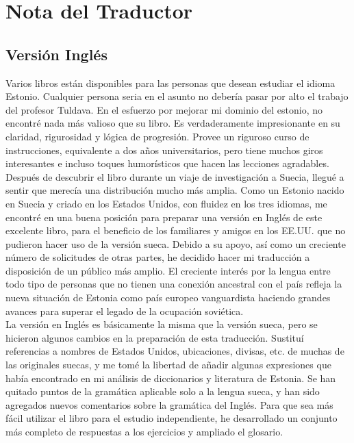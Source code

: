 \section*{Nota del Traductor}

\subsection*{Versión Inglés}

Varios libros están disponibles para las personas que desean estudiar el idioma Estonio. Cualquier persona seria en el asunto no debería pasar por alto el trabajo del profesor Tuldava. En el esfuerzo por mejorar mi dominio del estonio, no encontré nada más valioso que su libro. Es verdaderamente impresionante en su claridad, rigurosidad y lógica de progresión. Provee un riguroso curso de instrucciones, equivalente a dos años universitarios, pero tiene muchos giros interesantes e incluso toques humorísticos que hacen las lecciones agradables.\\

Después de descubrir el libro durante un viaje de investigación a Suecia, llegué a sentir que merecía una distribución mucho más amplia. Como un Estonio nacido en Suecia y criado en los Estados Unidos, con fluidez en los tres idiomas, me encontré en una buena posición para preparar una versión en Inglés de este excelente libro, para el beneficio de los familiares y amigos en los EE.UU. que no pudieron hacer uso de la versión sueca. Debido a su apoyo, así como un creciente número de solicitudes de otras partes, he decidido hacer mi traducción a disposición de un público más amplio. El creciente interés por la lengua entre todo tipo de personas que no tienen una conexión ancestral con el país refleja la nueva situación de Estonia como país europeo vanguardista haciendo grandes avances para superar el legado de la ocupación soviética.\\

La versión en Inglés es básicamente la misma que la versión sueca, pero se hicieron algunos cambios en la preparación de esta traducción. Sustituí referencias a nombres de Estados Unidos, ubicaciones, divisas, etc. de muchas de las originales suecas, y me tomé la libertad de añadir algunas expresiones que había encontrado en mi análisis de diccionarios y literatura de Estonia. Se han quitado puntos de la gramática aplicable solo a la lengua sueca, y han sido agregados nuevos comentarios sobre la gramática del Inglés. Para que sea más fácil utilizar el libro para el estudio independiente, he desarrollado un conjunto más completo de respuestas a los ejercicios y ampliado el glosario.\\

